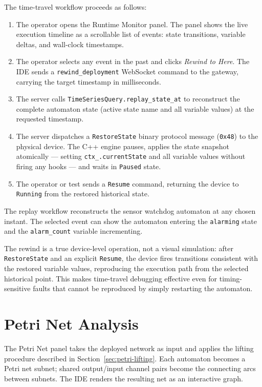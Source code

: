 The time-travel workflow proceeds as follows:

\begin{enumerate}
  \item The operator opens the Runtime Monitor panel.  The panel shows the
    live execution timeline as a scrollable list of events: state transitions,
    variable deltas, and wall-clock timestamps.
  \item The operator selects any event in the past and clicks
    \textit{Rewind to Here}.  The IDE sends a \texttt{rewind\_deployment}
    WebSocket command to the gateway, carrying the target timestamp in
    milliseconds.
  \item The server calls \texttt{TimeSeriesQuery.replay\_state\_at} to
    reconstruct the complete automaton state (active state name and all
    variable values) at the requested timestamp.
  \item The server dispatches a \texttt{RestoreState} binary protocol message
    (\texttt{0x48}) to the physical device.  The C++ engine pauses, applies
    the state snapshot atomically — setting \texttt{ctx\_.currentState} and
    all variable values without firing any hooks — and waits in
    \texttt{Paused} state.
  \item The operator or test sends a \texttt{Resume} command, returning the device
    to \texttt{Running} from the restored historical state.
\end{enumerate}

\noindent The replay workflow reconstructs the sensor watchdog automaton at any
chosen instant. The selected event can show the automaton entering the
\texttt{alarming} state and the \texttt{alarm\_count} variable incrementing.

The rewind is a true device-level operation, not a visual simulation: after
\texttt{RestoreState} and an explicit \texttt{Resume}, the device fires transitions
consistent with the restored variable values, reproducing the execution path
from the selected historical point.  This makes time-travel debugging effective
even for timing-sensitive faults that cannot be reproduced by simply restarting
the automaton.

\section{Petri Net Analysis}
\label{sec:demo-petri}

The Petri Net panel takes the deployed network as input and applies the lifting
procedure described in Section~\ref{sec:petri-lifting}. Each automaton becomes a
Petri net subnet; shared output/input channel pairs become the connecting arcs
between subnets. The IDE renders the resulting net as an interactive graph.

